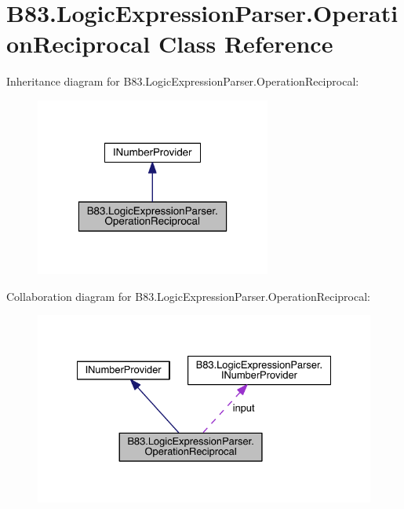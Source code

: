 \hypertarget{class_b83_1_1_logic_expression_parser_1_1_operation_reciprocal}{}\section{B83.\+Logic\+Expression\+Parser.\+Operation\+Reciprocal Class Reference}
\label{class_b83_1_1_logic_expression_parser_1_1_operation_reciprocal}


Inheritance diagram for B83.\+Logic\+Expression\+Parser.\+Operation\+Reciprocal\+:\nopagebreak
\begin{figure}[H]
\begin{center}
\leavevmode
\includegraphics[width=220pt]{class_b83_1_1_logic_expression_parser_1_1_operation_reciprocal__inherit__graph}
\end{center}
\end{figure}


Collaboration diagram for B83.\+Logic\+Expression\+Parser.\+Operation\+Reciprocal\+:\nopagebreak
\begin{figure}[H]
\begin{center}
\leavevmode
\includegraphics[width=330pt]{class_b83_1_1_logic_expression_parser_1_1_operation_reciprocal__coll__graph}
\end{center}
\end{figure}
